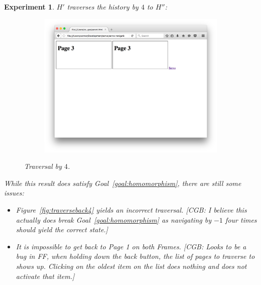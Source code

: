 \documentclass{article}
\newcommand{\aNH}{H}
\newtheorem{experiment}{Experiment}
\begin{document}
\begin{experiment}
  \emph{$\aNH'$ traverses the history by $4$ to $\aNH''$}:
  \begin{figure}[H]
    \begin{subfigure}{0.65\textwidth}
      \includegraphics[width=\linewidth]{images/experiments/forwardback4/firefox/5.png}
    \end{subfigure}
    \begin{subfigure}{0.25\textwidth}
    \end{subfigure}
    \caption{Traversal by $4$.}
  \end{figure}

  While this result does satisfy Goal~\ref{goal:homomorphism}, there are still some issues:
  \begin{itemize}
    \item Figure~\ref{fig:traverseback4} yields an incorrect traversal. [CGB: I believe this actually does break Goal~\ref{goal:homomorphism} as navigating by $-1$ four times should yield the correct state.]
    \item It is impossible to get back to Page 1 on both Frames. [CGB: Looks to be a bug in FF, when holding down the back button, the list of pages to traverse to shows up. Clicking on the oldest item on the list does nothing and does not activate that item.]
  \end{itemize}

\end{experiment}
\end{document}
